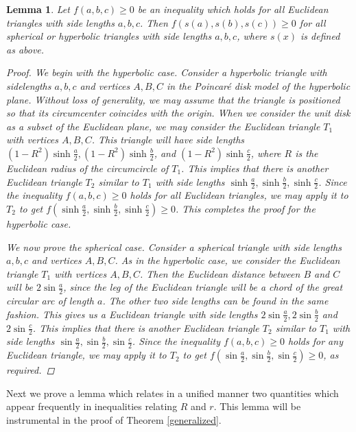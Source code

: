 \documentclass[12pt,notitlepage]{amsart}%
\newtheorem{lemma}[theorem]{Lemma}
\newcommand{\s}[1]{\sin \frac{#1}{2}}
\newcommand{\sh}[1]{\sinh \frac{#1}{2}}
\begin{document}
\begin{lemma}\label{unification}
Let $f(a,b,c) \geq 0$ be an inequality which holds for all Euclidean triangles with side lengths $a,b,c$. Then $f(s(a), s(b), s(c)) \geq 0$ for all spherical or hyperbolic triangles with side lengths $a, b, c$, where $s(x)$ is defined as above.

\begin{proof} 
We begin with the hyperbolic case. Consider a hyperbolic triangle with sidelengths $a, b,c$ and vertices $A,B,C$ in the Poincar\'e disk model of the hyperbolic plane. Without loss of generality, we may assume that the triangle is positioned so that its circumcenter coincides with the origin. When we consider the unit disk as a subset of the Euclidean plane, we may consider the Euclidean triangle $T_1$ with vertices $A, B, C$. This triangle will have side lengths $(1-R^2)\sh{a}, (1-R^2)\sh{b}$, and $(1-R^2)\sh{c}$, where $R$ is the Euclidean radius of the circumcircle of $T_1$. This implies that there is another Euclidean triangle $T_2$ similar to $T_1$ with side lengths $\sh{a}, \sh{b}, \sh{c}$. Since the inequality $f(a,b,c) \geq 0$ holds for all Euclidean triangles, we may apply it to $T_2$ to get $f(\sh{a}, \sh{b}, \sh{c}) \geq 0$. This completes the proof for the hyperbolic case.

We now prove the spherical case. Consider a spherical triangle with side lengths $a,b,c$ and vertices $A,B,C$. As in the hyperbolic case, we consider the Euclidean triangle $T_1$ with vertices $A,B,C$. Then the Euclidean distance between $B$ and $C$ will be $2 \s{a}$, since the leg of the Euclidean triangle will be a chord of the great circular arc of length $a$. The other two side lengths can be found in the same fashion. This gives us a Euclidean triangle with side lengths $2\s{a}, 2\s{b}$ and  $2\s{c}$. This implies that there is another Euclidean triangle $T_2$ similar to $T_1$ with side lengths $\s{a}, \s{b}, \s{c}$. Since the inequality $f(a,b,c) \geq 0$ holds for any Euclidean triangle, we may apply it to $T_2$ to get $f(\s{a}, \s{b}, \s{c}) \geq 0$, as required. 

\end{proof}
\end{lemma}

Next we prove a lemma which relates in a unified manner two quantities which appear frequently in inequalities relating $R$ and $r$. This lemma will be instrumental in the proof of Theorem \ref{generalized}.
\end{document}
